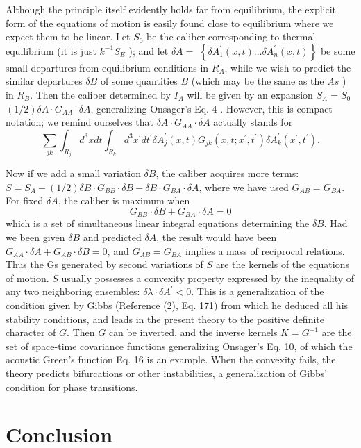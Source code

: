 \documentclass{article}
\begin{document}
Although the principle itself evidently holds far from equilibrium, the explicit form of the equations of motion is easily found close to equilibrium where we expect them to be linear. Let $S_0$ be the caliber corresponding to thermal equilibrium (it is just $k^{-1} S_E$ ); and let $\delta A=$ $\left\{\delta A_1^{\prime}(x, t) \ldots \delta A_n^{\prime}(x, t)\right\}$ be some small departures from equilibrium conditions in $R_A$, while we wish to predict the similar departures $\delta B$ of some quantities $B$ (which may be the same as the $A s$ ) in $R_B$. Then the caliber determined by $I_A$ will be given by an expansion $S_A=S_0$ $(1 / 2) \delta A \cdot G_{A A} \cdot \delta A$, generalizing Onsager's Eq. 4 . However, this is compact notation; we remind ourselves that $\delta A \cdot G_{A A} \cdot \delta A$ actually stands for
$$
\sum_{j k} \int_{R_j} d^3 x d t \int_{R_k} d^3 x^{\prime} d t^{\prime} \delta A_j^{\prime}(x, t) G_{j k}\left(x, t ; x^{\prime}, t^{\prime}\right) \delta A_k^{\prime}\left(x^{\prime}, t^{\prime}\right).
$$

Now if we add a small variation $\delta B$, the caliber acquires more terms: $S=S_A-(1 / 2) \delta B \cdot G_{B B} \cdot \delta B-\delta B \cdot G_{B A} \cdot \delta A$, where we have used $G_{A B}=G_{B A}$. For fixed $\delta A$, the caliber is maximum when
$$
G_{B B} \cdot \delta B+G_{B A} \cdot \delta A=0
$$
which is a set of simultaneous linear integral equations determining the $\delta B$. Had we been given $\delta B$ and predicted $\delta A$, the result would have been $G_{A A} \cdot \delta A+G_{A B} \cdot \delta B=0$, and $G_{A B}=G_{B A}$ implies a mass of reciprocal relations. Thus the Gs generated by second variations of $S$ are the kernels of the equations of motion.
$S$ usually possesses a convexity property expressed by the inequality of any two neighboring ensembles: $\delta \lambda \cdot \delta A^{\prime}<0$. This is a generalization of the condition given by Gibbs (Reference (2), Eq. 171) from which he deduced all his stability conditions, and leads in the present theory to the positive definite character of $G$. Then $G$ can be inverted, and the inverse kernels $K=G^{-1}$ are the set of space-time covariance functions generalizing Onsager's Eq. 10, of which the acoustic Green's function Eq. 16 is an example. When the convexity fails, the theory predicts bifurcations or other instabilities, a generalization of Gibbs' condition for phase transitions.

\section{Conclusion}
\end{document}
